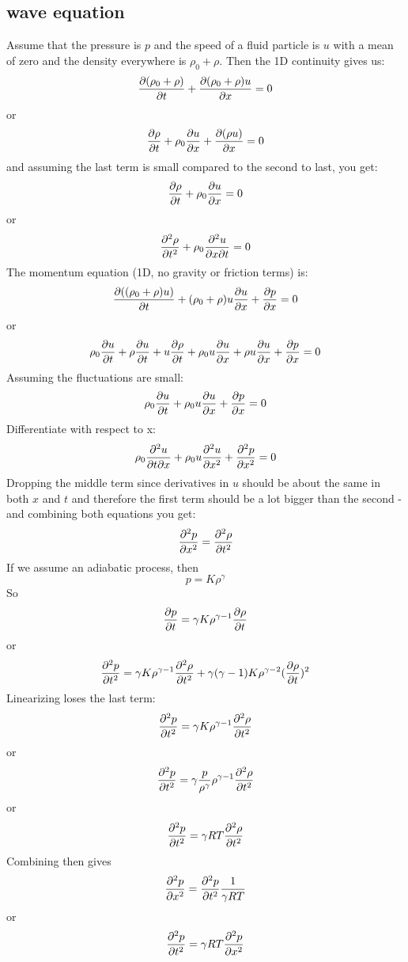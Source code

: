 \documentclass[11pt, oneside]{article}   	%
\begin{document}
\subsection{wave equation}
Assume that the pressure is $p$ and the speed of a fluid particle is $u$ with a mean of zero and the density everywhere is $\rho_0 + \rho$.  Then the 1D continuity gives us:
$$ {\partial (\rho_0 + \rho) \over \partial t} + {\partial (\rho_0 + \rho)u \over \partial x}=0$$
or
$$ {\partial  \rho \over \partial t} + \rho_0{\partial  u \over \partial x}+ {\partial (\rho u) \over \partial x}=0$$
and assuming the last term is small compared to the second to last, you get:
$$ {\partial  \rho \over \partial t} + \rho_0{\partial  u \over \partial x}=0$$
or
$$ {\partial^2  \rho \over \partial t^2} + \rho_0{\partial^2  u \over \partial x\partial t}=0$$
The momentum equation (1D, no gravity or friction terms) is:
$$ {\partial  ((\rho_0 + \rho)u) \over \partial t}+(\rho_0 + \rho)u{\partial u\over \partial x} +{\partial p\over \partial x} = 0$$
or
$$\rho_0 {\partial  u \over \partial t}+ \rho {\partial u \over \partial t}+ u {\partial \rho \over \partial t}+\rho_0 u{\partial u\over \partial x} + \rho u{\partial u\over \partial x}+{\partial p\over \partial x} = 0$$
Assuming the fluctuations are small:
$$\rho_0 {\partial  u \over \partial t}+\rho_0 u{\partial u\over \partial x} +{\partial p\over \partial x} = 0$$
Differentiate with respect to x:
$$\rho_0 {\partial^2  u \over \partial t \partial x}+\rho_0 u{\partial^2 u\over \partial x^2} +{\partial^2 p\over \partial x^2} = 0$$
Dropping the middle term since derivatives in $u$ should be about the same in both $x$ and $t$ and therefore the first term should be a lot bigger than the second - and combining both equations you get:
$$ {\partial^2 p\over \partial x^2} = {\partial^2  \rho \over \partial t^2} $$
If we assume an adiabatic process, then
$$p=K\rho^\gamma$$
So
$${\partial p\over\partial t}=\gamma K\rho^{\gamma-1}{\partial \rho\over \partial t}$$
or
$${\partial^2 p\over\partial t^2}=\gamma K\rho^{\gamma-1}{\partial^2 \rho\over \partial t^2}+ \gamma(\gamma-1) K\rho^{\gamma-2}({\partial \rho\over \partial t})^2$$
Linearizing loses the last term:
$${\partial^2 p\over\partial t^2}=\gamma K\rho^{\gamma-1}{\partial^2 \rho\over \partial t^2}$$
or 
$${\partial^2 p\over\partial t^2}=\gamma {p\over \rho^\gamma}\rho^{\gamma-1}{\partial^2 \rho\over \partial t^2}$$
or
$${\partial^2 p\over\partial t^2}=\gamma RT{\partial^2 \rho\over \partial t^2}$$
Combining then gives
$$ {\partial^2 p\over \partial x^2} = {\partial^2 p\over\partial t^2}{1\over \gamma RT} $$
or
$$ {\partial^2 p\over\partial t^2}={ \gamma RT} {\partial^2 p\over \partial x^2} $$
\end{document}

